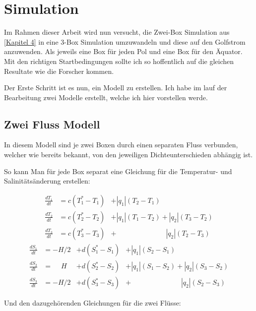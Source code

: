 \section{Simulation}

Im Rahmen dieser Arbeit wird nun versucht, die Zwei-Box Simulation aus \ref{Kapitel 4} in eine 3-Box Simulation umzuwandeln und diese auf den Golfstrom anzuwenden.
Als jeweils eine Box für jeden Pol und eine Box für den Äquator.
Mit den richtigen Startbedingungen sollte ich so hoffentlich auf die gleichen Resultate wie die Forscher kommen.

Der Erste Schritt ist es nun, ein Modell zu erstellen. Ich habe im lauf der Bearbeitung zwei Modelle erstellt, welche ich hier vorstellen werde. 

\subsection{Zwei Fluss Modell}

In diesem Modell sind je zwei Boxen durch einen separaten Fluss verbunden, welcher wie bereits bekannt, von den jeweiligen Dichteunterschieden abhängig ist.


So kann Man für jede Box separat eine Gleichung für die Temperatur- und Salinitätsänderung erstellen:

\begin{equation}
\begin{aligned}
\frac{dT_1}{dt} &= c(T_1^*-T_1)&+|q_1|(T_2-T_1)\phantom{+|q_2|(T_3-T_2)}
\\
\frac{dT_2}{dt} &= c(T_2^*-T_2)&+|q_1|(T_1-T_2)+|q_2|(T_3-T_2)
\\
\frac{dT_3}{dt} &= c(T_3^*-T_3)&+ \phantom{+|q_1|(T_1-T_2)}|q_2|(T_2-T_3)
\end{aligned}
\end{equation}
\begin{equation}
\begin{aligned}
\frac{dS_1}{dt} &= -H/2 &+ d(S_1^*-S_1)&+|q_1|(S_2-S_1)\phantom{+|q_2|(S_3-S_2)}
\\
\frac{dS_2}{dt} &= \phantom{-}H &+ d(S_2^*-S_2)&+|q_1|(S_1-S_2)+|q_2|(S_3-S_2)	
\\
\frac{dS_3}{dt} &= -H/2 &+d(S_3^*-S_3)&+ \phantom{+|q_1|(S_1-S_2)}|q_2|(S_2-S_3)
\end{aligned}
\end{equation}	

Und den dazugehörenden Gleichungen für die zwei Flüsse:

